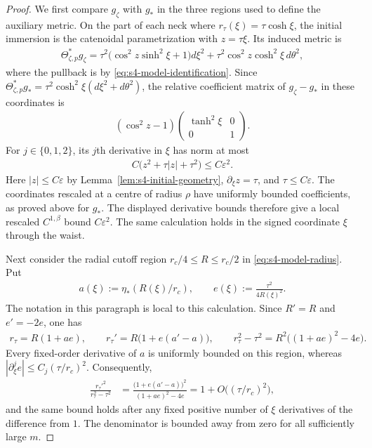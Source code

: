 \documentclass[a4paper,11pt,oneside,reqno]{amsart}
\numberwithin{equation}{section}
\theoremstyle{definition}
\begin{document}
\begin{proof}
    We first compare $g_\zeta$ with $g_*$ in the three
    regions used to define the auxiliary metric.
    On the part of each neck where
    $r_\tau(\xi)=\tau\cosh\xi$, the initial immersion is
    the catenoidal parametrization with $z=\tau\xi$.
    Its induced metric is
    \begin{align*}
        \Theta_{\zeta,p}^*g_\zeta
        =\tau^2\bigl(\cos^2z\sinh^2\xi+1\bigr)d\xi^2
        +\tau^2\cos^2z\cosh^2\xi\,d\theta^2,
    \end{align*}
    where the pullback is by \eqref{eq:s4-model-identification}.
    Since $\Theta_{\zeta,p}^*g_*=\tau^2\cosh^2\xi
    (d\xi^2+d\theta^2)$, the
    relative coefficient matrix of $g_\zeta-g_*$ in these
    coordinates is
    \begin{align*}
        (\cos^2z-1)
        \begin{pmatrix}
            \tanh^2\xi&0\\
            0&1
        \end{pmatrix}.
    \end{align*}
    For $j\in\{0,1,2\}$, its $j$th derivative in $\xi$
    has norm at most
    \begin{align*}
        C\bigl(z^2+\tau|z|+\tau^2\bigr)
        \leq C\varepsilon^2.
    \end{align*}
    Here $|z|\leq C\varepsilon$ by
    Lemma~\ref{lem:s4-initial-geometry},
    $\partial_\xi z=\tau$, and $\tau\leq C\varepsilon$.
    The coordinates rescaled at a centre of radius $\rho$
    have uniformly bounded coefficients, as proved above
    for $g_*$. The displayed derivative bounds therefore
    give a local rescaled $C^{1,\beta}$ bound
    $C\varepsilon^2$. The same calculation holds in the
    signed coordinate $\xi$ through the waist.

    Next consider the radial cutoff region
    $r_c/4\leq R\leq r_c/2$ in
    \eqref{eq:s4-model-radius}. Put
    \begin{align*}
        a(\xi):=\eta_*(R(\xi)/r_c),
        \qquad e(\xi):=\frac{\tau^2}{4R(\xi)^2}.
    \end{align*}
    The notation in this paragraph is local to this
    calculation. Since $R'=R$ and $e'=-2e$, one has
    \begin{align*}
        r_\tau=R(1+ae),\qquad
        r_\tau'=R\bigl(1+e(a'-a)\bigr),\qquad
        r_\tau^2-\tau^2
        =R^2\bigl((1+ae)^2-4e\bigr).
    \end{align*}
    Every fixed-order derivative of $a$ is uniformly
    bounded on this region, whereas
    $|\partial_\xi^j e|\leq C_j(\tau/r_c)^2$.
    Consequently,
    \begin{align*}
        \frac{r_\tau'^2}{r_\tau^2-\tau^2}
        &=\frac{\bigl(1+e(a'-a)\bigr)^2}
        {(1+ae)^2-4e}
        =1+O\bigl((\tau/r_c)^2\bigr),
    \end{align*}
    and the same bound holds after any fixed positive
    number of $\xi$ derivatives of the difference from
    $1$. The denominator is bounded away from zero for
    all sufficiently large $m$.


\end{proof}
\end{document}
